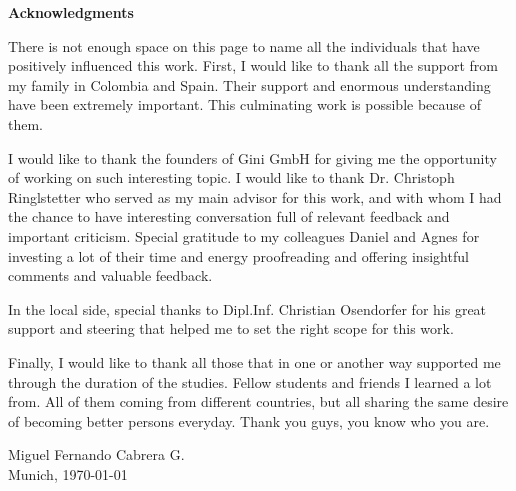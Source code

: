 \clearemptydoublepage
{}
{}	



\vspace*{2cm}

\begin{center}
{\Large \bf Acknowledgments}
\end{center}

\vspace{1cm}

There is not enough space on this page to name all the individuals that have
positively influenced this work. 
First, I would like to thank all the support from my family in
Colombia and Spain. Their support and enormous understanding have been
extremely important. This culminating work is possible because of them. 

I would like to thank  the founders of  Gini GmbH for giving me the opportunity of working on such interesting topic.  I would like to thank  Dr. Christoph Ringlstetter who served as
my main advisor for this work, and with whom I had the chance to have
interesting conversation full of relevant feedback and important criticism. 
Special gratitude to my colleagues  Daniel and Agnes for investing a lot of their time and energy  proofreading and offering insightful comments and valuable feedback.

In the local side,  special thanks to  Dipl.Inf. Christian
Osendorfer for his great support and steering that helped me to set the right
scope for this work. 

Finally, I would like to thank all those that in one or another way supported me through the duration of the studies. Fellow students and friends I learned a lot from. All of them coming from different countries, but all sharing the same desire of becoming better persons everyday.  Thank you guys, you know who you are. 


\vspace*{0.35\textheight}

	\noindent
\hspace*{0.6\textwidth} Miguel Fernando Cabrera G. \\
\hspace*{0.6\textwidth} Munich, \today


